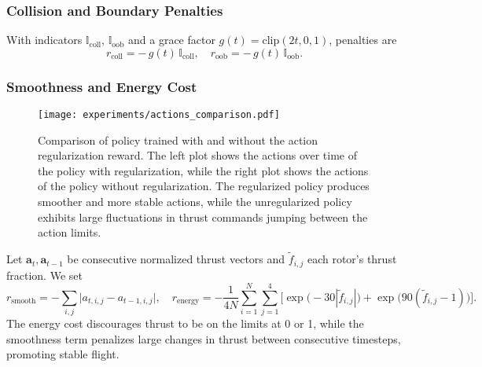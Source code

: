 \subsubsection{Collision and Boundary Penalties}
With indicators \(\mathbb{I}_{\mathrm{coll}}\), \(\mathbb{I}_{\mathrm{oob}}\) and a grace factor \(g(t)=\mathrm{clip}(2t,0,1)\), penalties are
\begin{equation}
r_{\mathrm{coll}} = -\,g(t)\,\mathbb{I}_{\mathrm{coll}}, 
\quad
r_{\mathrm{oob}} = -\,g(t)\,\mathbb{I}_{\mathrm{oob}}.
\end{equation}

\subsubsection{Smoothness and Energy Cost}
\begin{figure}[ht]
    \centering
    
    \texttt{[image: experiments/actions\_comparison.pdf]}
    \caption[Policy comparison with/without action regularization]{Comparison of policy trained with and without the action regularization reward. The left plot shows the actions over time of the policy with regularization, while the right plot shows the actions of the policy without regularization. The regularized policy produces smoother and more stable actions, while the unregularized policy exhibits large fluctuations in thrust commands jumping between the action limits.}
    \label{fig:}
\end{figure}
Let \(\mathbf{a}_t,\mathbf{a}_{t-1}\) be consecutive normalized thrust vectors and \(\tilde f_{i,j}\) each rotor's thrust fraction.  We set
\begin{equation}
r_{\mathrm{smooth}}
= -\sum_{i,j} \bigl|a_{t,i,j}-a_{t-1,i,j}\bigr|,
\quad
r_{\mathrm{energy}}
= -\frac{1}{4N}\sum_{i=1}^N\sum_{j=1}^4\bigl[\exp\bigl(-30|\tilde f_{i,j}|\bigr)+\exp\bigl(90(\tilde f_{i,j}-1)\bigr)\bigr].
\end{equation}
The energy cost discourages thrust to be on the limits at 0 or 1, while the smoothness term penalizes large changes in thrust between consecutive timesteps, promoting stable flight.

